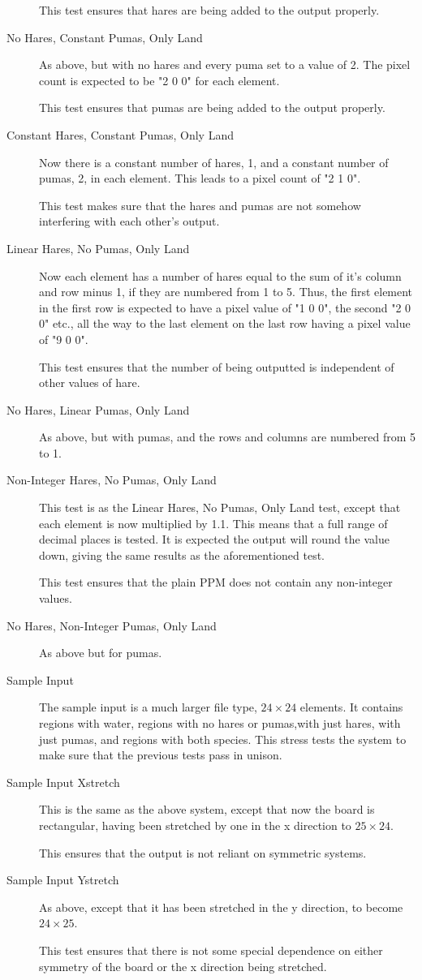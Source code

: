 \begin{description}
			This test ensures that hares are being added to the output properly.
		\item[No Hares, Constant Pumas, Only Land]
			As above, but with no hares and every puma set to a value of 2.
			The pixel count is expected to be "2 0 0" for each element.

			This test ensures that pumas are being added to the output properly.
		\item[Constant Hares, Constant Pumas, Only Land]
			Now there is a constant number of hares, 1, and a constant number of pumas, 2, in each element.
			This leads to a pixel count of "2 1 0".
			
			This test makes sure that the hares and pumas are not somehow interfering with each other's output.
		\item[Linear Hares, No Pumas, Only Land]
			Now each element has a number of hares equal to the sum of it's column and row minus 1, if they are numbered from 1 to 5.
			Thus, the first element in the first row is expected to have a pixel value of "1 0 0", the second "2 0 0" etc., all the way to the last element on the last row having a pixel value of "9 0 0".

			This test ensures that the number of being outputted is independent of other values of hare.
		\item[No Hares, Linear Pumas, Only Land]
			As above, but with pumas, and the rows and columns are numbered from 5 to 1.
		\item[Non-Integer Hares, No Pumas, Only Land]
			This test is as the Linear Hares, No Pumas, Only Land test, except that each element is now multiplied by 1.1.
			This means that a full range of decimal places is tested.
			It is expected the output will round the value down, giving the same results as the aforementioned test.

			This test ensures that the plain PPM does not contain any non-integer values.
		\item[No Hares, Non-Integer Pumas, Only Land]
			As above but for pumas.
		\item[Sample Input]
			The sample input is a much larger file type, $24\times24$ elements.
			It  contains regions with water, regions with no hares or pumas,with just hares, with just pumas, and regions with both species.
			This stress tests the system to make sure that the previous tests pass in unison.
		\item[Sample Input Xstretch]
			This is the same as the above system, except that now the board is rectangular, having been stretched by one in the x direction to $25\times24$.

			This ensures that the output is not reliant on symmetric systems.
		\item[Sample Input Ystretch]
			As above, except that it has been stretched in the y direction, to become $24\times25$.
			
			This test ensures that there is not some special dependence on either symmetry of the board or the x direction being stretched.
	\end{description}
